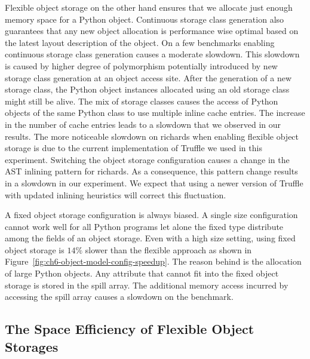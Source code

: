 Flexible object storage on the other hand ensures that we allocate just enough memory space for a Python object.
Continuous storage class generation also guarantees that any new object allocation is performance wise optimal based on the latest layout description of the object.
On a few benchmarks enabling continuous storage class generation causes a moderate slowdown.
This slowdown is caused by higher degree of polymorphism potentially introduced by new storage class generation at an object access site.
After the generation of a new storage class, the Python object instances allocated using an old storage class might still be alive.
The mix of storage classes causes the access of Python objects of the same Python class to use multiple inline cache entries.
The increase in the number of cache entries leads to a slowdown that we observed in our results.
The more noticeable slowdown on \textsf{richards} when enabling flexible object storage is due to the current implementation of Truffle we used in this experiment.
Switching the object storage configuration causes a change in the AST inlining pattern for \textsf{richards}.
As a consequence, this pattern change results in a slowdown in our experiment.
We expect that using a newer version of Truffle with updated inlining heuristics will correct this fluctuation.

A fixed object storage configuration is always biased.
A single size configuration cannot work well for all Python programs let alone the fixed type distribute among the fields of an object storage.
Even with a high size setting, using fixed object storage is $14\%$ slower than the flexible approach as shown in Figure~\ref{fig:ch6-object-model-config-speedup}.
The reason behind is the allocation of large Python objects.
Any attribute that cannot fit into the fixed object storage is stored in the spill array.
The additional memory access incurred by accessing the spill array causes a slowdown on the benchmark.

\subsection{The Space Efficiency of Flexible Object Storages}


